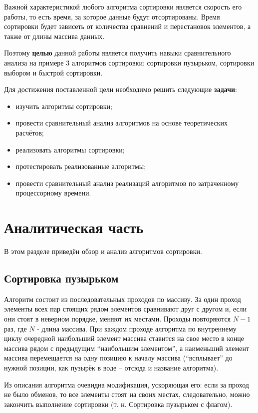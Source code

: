 \documentclass[12pt]{report}
\begin{document}
Важной характеристикой любого алгоритма сортировки является скорость его работы, то есть время, за которое данные будут отсортированы. Время сортировки будет зависеть от количества сравнений и перестановок элементов, а также от длины массива данных. 

Поэтому \textbf{целью} данной работы является получить навыки сравнительного анализа на примере 3 алгоритмов сортировки: сортировки пузырьком, сортировки выбором и быстрой сортировки. 

Для достижения поставленной цели необходимо решить следующие \textbf{задачи}:
\begin{itemize}
\item изучить алгоритмы сортировки;
\item провести сравнительный анализ алгоритмов на основе теоретических расчётов;
\item реализовать алгоритмы сортировки;
\item протестировать реализованные алгоритмы;
\item провести сравнительный анализ реализаций алгоритмов по затраченному процессорному времени.
\end{itemize}


\chapter{Аналитическая часть}

В этом разделе приведён обзор и анализ алгоритмов сортировки.

\section{Сортировка пузырьком}

Алгоритм состоит из последовательных проходов по массиву. За один проход элементы всех пар стоящих рядом элементов сравнивают друг с другом и, если они стоят в неверном порядке, меняют их местами. Проходы повторяются $N - 1$ раз, где $N$ - длина массива. При каждом проходе алгоритма по внутреннему циклу очередной наибольший элемент массива ставится на свое место в конце массива рядом с предыдущим ``наибольшим элементом'', а наименьший элемент массива перемещается на одну позицию к началу массива (``всплывает'' до нужной позиции, как пузырёк в воде -- отсюда и название алгоритма).

Из описания алгоритма очевидна модификация, ускоряющая его: если за проход не было обменов, то все элементы стоят на своих местах, следовательно, можно закончить выполнение сортировки (т. н. Сортировка пузырьком с флагом). 
\end{document}
